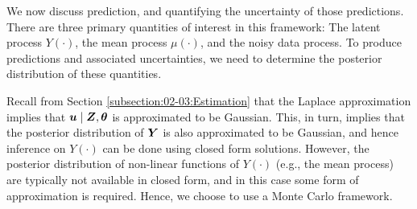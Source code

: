 \documentclass[nojss]{jss}
\newcommand{\red}[1]{\textcolor{red}{#1}}
\def\mbf#1{{%
\mathchoice%
{\hbox{\boldmath$\displaystyle{#1}$}}%
{\hbox{\boldmath$\textstyle{#1}$}}%
{\hbox{\boldmath$\scriptstyle{#1}$}}%
{\hbox{\boldmath$\scriptscriptstyle{#1}$}}%
}}
\def\vec{\mbf}
\newcommand{\Gau}{{\text{Gau}}}
\newcommand{\ECurly}[1]{\mathbb{E}\left\{#1\right\}} %
\newcommand{\tp}{{\!\scriptscriptstyle \top}}
\begin{document}
% 


We now discuss prediction, and quantifying the uncertainty of those predictions. 
There are three primary quantities of interest in this framework: The latent process $Y(\cdot)$, the  mean process $\mu(\cdot)$, and the noisy data process. 
 To produce predictions and associated uncertainties, we need to determine the posterior distribution of these quantities.

Recall from Section 
\ref{subsection:02-03:Estimation} 
 that the Laplace approximation implies that %
 $\vec{u} \mid \vec{Z}, \vec{\theta}$ is approximated to be Gaussian. %
 This, in turn, implies that the posterior distribution of $\vec{Y}$ is also approximated to be Gaussian, and hence inference on $Y(\cdot)$ can be done using closed form solutions. 
  However, the posterior distribution of non-linear functions of $Y(\cdot)$ (e.g., the mean process) are typically not available in closed form, and in this case some form of approximation is required.
   Hence, we choose to use a Monte Carlo framework.
\end{document}
